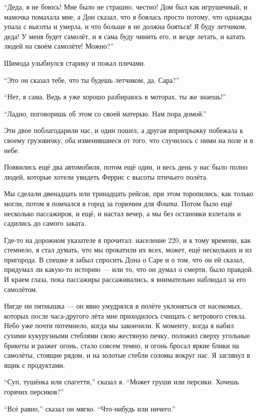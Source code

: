 ``Деда, я не боюсь! Мне было не страшно, честно! Дом был как игрушечный, и мамочка помахала мне, а
 Дон сказал, что я боялась просто потому, что однажды упала с высоты и умерла, и что больше я не
 должна бояться! Я буду летчиком, деда! У меня будет самолёт, и я сама буду чинить его, и везде
 летать, и катать людей на своём самолёте! Можно?''

Шимода улыбнулся старику и пожал плечами.

``Это он сказал тебе, что ты будешь летчиком, да, Сара?''

``Нет, я сама. Ведь я уже хорошо разбираюсь в моторах, ты же знаешь!''

``Ладно, поговоришь об этом со своей матерью. Нам пора домой.''

Эти двое поблагодарили нас, и один пошел, а другая вприпрыжку побежала к своему грузовичку, оба изменившиеся от того, что случилось с ними на поле и в небе.

Появились ещё два автомобиля, потом ещё один, и весь день у нас было полно людей, которые хотели увидеть Феррис с высоты птичьего полёта.

Мы сделали двенадцать или тринадцать рейсов, при этом торопились, как только могли, потом я
помчался в город за горючим для {\it Флита}. Потом было ещё несколько пассажиров, и ещё, и настал вечер, а мы без остановки взлетали и садились до самого заката.

Где-то на дорожном указателе я прочитал: население 220, и к тому времени, как стемнело, я стал
думать, что мы прокатили их всех, может, ещё нескольких и из пригорода. В спешке я забыл спросить Дона о Саре и о том, что он ей сказал, придумал ли какую-то историю --- или то, что он думал о смерти, было правдой. И краем глаза, пока пассажиры рассаживались, я внимательно наблюдал за его самолётом.

Нигде ни пятнышка --- он явно умудрялся в полёте уклоняться от насекомых, которых после часа-другого лёта мне приходилось счищать с ветрового стекла.
Небо уже почти потемнело, когда мы закончили. К моменту, когда я набил сухими кукурузными стеблями свою жестяную печку, положил сверху угольные брикеты и разжег огонь, стало совсем темно, и огонь бросал яркие блики на самолёты, стоящие рядом, и на золотые стебли соломы вокруг нас. Я заглянул в ящик с продуктами.

``Суп, тушёнка или спагетти,'' сказал я. ``Может груши или персики. Хочешь горячих персиков?''

``Всё равно,'' сказал он мягко. ``Что-нибудь или ничего.''


